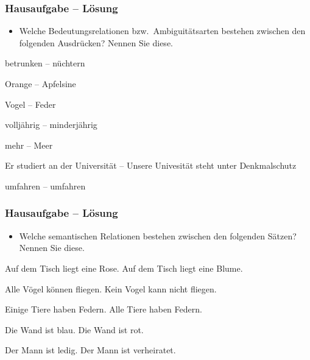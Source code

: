
\begin{frame}
\frametitle{Hausaufgabe -- Lösung}

\begin{itemize}
\item Welche Bedeutungsrelationen bzw.\ Ambiguitätsarten bestehen zwischen den folgenden Ausdrücken? Nennen Sie diese.
\end{itemize}

\settowidth{}
\ea 
	\ea betrunken -- nüchtern \pause 
	
	\ex Orange -- Apfelsine \pause 
	
	\ex Vogel -- Feder \pause 
	
	
	\ex volljährig -- minderjährig \pause 
	
	\ex mehr -- Meer \pause 
	
	\ex Er studiert an der Universität -- Unsere Univesität steht unter Denkmalschutz \pause
	
	\ex umfahren -- umfahren \pause
	\z
\z 

\end{frame}


\begin{frame}
\frametitle{Hausaufgabe -- Lösung}

\begin{itemize}
	\item Welche semantischen Relationen bestehen zwischen den folgenden Sätzen? Nennen Sie diese.
\end{itemize}

\settowidth{}
\ea 
\ea Auf dem Tisch liegt eine Rose.
\ex Auf dem Tisch liegt eine Blume.
\pause 
{}
\z 

\pause 
\medskip

\ex 	
\ea Alle Vögel können fliegen.
\ex Kein Vogel kann nicht fliegen.
\pause 
{}
\z 

\pause 
\medskip

\ex 	
\ea Einige Tiere haben Federn.
\ex Alle Tiere haben Federn.
\pause 
{}
\z

\pause
\medskip

\ex
\ea Die Wand ist blau.
\ex Die Wand ist rot.
\pause
{}
\z

\pause
\medskip

\ex
\ea Der Mann ist ledig.
\ex Der Mann ist verheiratet.
\pause
{}
\z

\z 

\end{frame}

